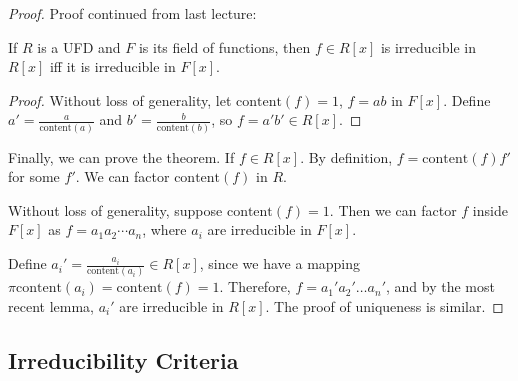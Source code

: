 \documentclass[a4paper,twoside,master.tex]{subfiles}
\begin{document}

\begin{proof}
    Proof continued from last lecture:

    \begin{lemma}
        If $ R $ is a UFD and $ F $ is its field of functions, then $ f \in R[x] $ is irreducible in $ R[x] $ iff it is irreducible in $ F[x] $.
    \end{lemma}
    \begin{proof}
        Without loss of generality, let $ \text{content}(f) = 1 $, $ f = a b $ in $ F[x] $. Define $ a' = \frac{a}{\text{content}(a)} $ and $ b' = \frac{b}{\text{content}(b)} $, so $ f = a'b' \in R[x] $. 
    \end{proof}
    Finally, we can prove the theorem. If $ f \in R[x] $. By definition, $ f = \text{content}(f) f' $ for some $ f' $. We can factor $ \text{content}(f) $ in $ R $.

    Without loss of generality, suppose $ \text{content}(f) = 1 $. Then we can factor $ f $ inside $ F[x] $ as $ f = a_1 a_2 \cdots a_n $, where $ a_i $ are irreducible in $ F[x] $.

    Define $ a_i' = \frac{a_i}{\text{content}(a_i)} \in R[x]  $, since we have a mapping $ \pi \text{content}(a_i) = \text{content}(f) = 1 $. Therefore, $ f = a_1' a_2' \ldots a_n' $, and by the most recent lemma, $ a_i' $ are irreducible in $ R[x] $. The proof of uniqueness is similar.
\end{proof}

\subsection{Irreducibility Criteria}
\label{sub:irreducibility_criteria}
\end{document}

